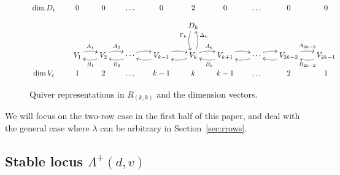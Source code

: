 \documentclass[11pt,reqno]{amsart}
\numberwithin{equation}{section}
\theoremstyle{definition}
\newcommand{\ld}{\lambda}
\begin{document}
\begin{figure}[ht!]
\caption{Quiver representations in $R_{(k,k)}$ and the dimension vectors.}
 \label{figure:Skk}
\[ 
\xymatrix@C=18pt@R=9pt{
\dim D_i& 0&0&\ldots&0&2&0&\ldots&0&0
\\
&
& &  &   &
\ar@/_/[dd]_<(0.2){\Gamma_k}
D_k
& &  &  &
\\ & & & & & & &  && 
\\ 
&%
{V_1}  
	\ar@/^/[r]^{A_1} 
	& 
	\ar@/^/[l]^{B_1}
{V_2}
	\ar@/^/[r]^{A_2}
	&
	\ar@/^/[l]^{B_2}
	\cdots
	\ar@/^/[r]%
	&   
	\ar@/^/[l]%
{V_{k-1}} 
	\ar@/^/[r]%
	& 
	\ar@/^/[l]%
{V_k}  
	\ar@/_/[uu]_>(0.8){\Delta_k} 
	\ar@/^/[r]^{A_{k}}
	&   
	\ar@/^/[l]^{B_k}
{V_{k+1}}  
	\ar@/^/[r]%
	& 
	\ar@/^/[l]%
	\cdots
	\ar@/^/[r]%
	&
	\ar@/^/[l]%
{V_{2k-2}}  
	\ar@/^/[r]^{A_{2k-2}}
	& 
{V_{2k-1}} 
\ar@/^/[l]^{B_{2k-2}}  
\\
\dim V_i & 1&2&\ldots&k-1&k&k-1&\ldots&2&1
}
\] 
\end{figure}
We will focus on the two-row case in the first half of this paper, and deal with the general case where $\ld$ can be arbitrary in Section~\ref{sec:rrows}.
\subsection{Stable locus $\Lambda^+(d,v)$}
\end{document}
